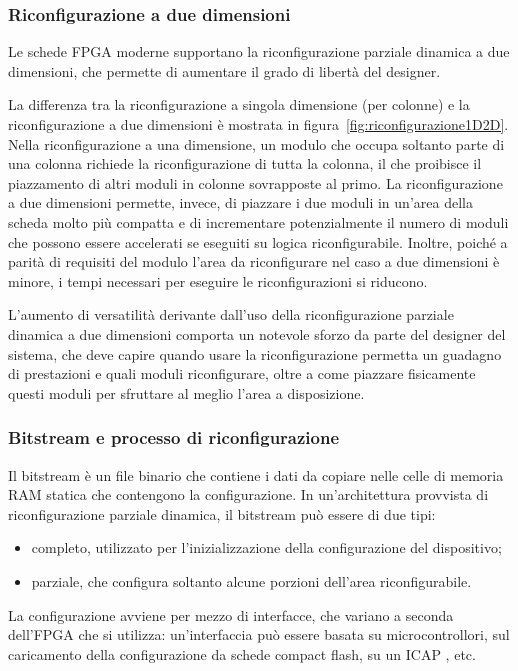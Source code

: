 \subsubsection{Riconfigurazione a due dimensioni}
Le schede \ac{FPGA} moderne supportano la riconfigurazione parziale dinamica a due dimensioni,
che permette di aumentare il grado di libertà del designer.

La differenza tra la riconfigurazione a singola dimensione (per colonne) e la
riconfigurazione a due dimensioni è mostrata in figura~\ref{fig:riconfigurazione1D2D}.
Nella riconfigurazione a una dimensione, un modulo che occupa soltanto parte di una
colonna richiede la riconfigurazione di tutta la colonna, il che proibisce il piazzamento
di altri moduli in colonne sovrapposte al primo. La riconfigurazione a due dimensioni
permette, invece, di piazzare i due moduli in un'area della scheda molto più compatta e di
incrementare potenzialmente il numero di moduli che possono essere accelerati se eseguiti
su logica riconfigurabile. Inoltre, poich\'e a parit\`a di requisiti del modulo l'area da
riconfigurare nel caso a due dimensioni \`e minore, i tempi necessari per eseguire
le riconfigurazioni si riducono.

L'aumento di versatilità derivante dall'uso della riconfigurazione parziale dinamica
a due dimensioni comporta un notevole sforzo da parte del designer del sistema,
che deve capire quando usare la riconfigurazione permetta un guadagno di prestazioni
e quali moduli riconfigurare, oltre a come piazzare fisicamente questi moduli per sfruttare al
meglio l'area a disposizione.

\subsubsection{Bitstream e processo di riconfigurazione}
Il bitstream è un file binario che contiene i dati da copiare nelle celle di memoria RAM
statica che contengono la configurazione. In un'architettura provvista di
riconfigurazione parziale dinamica, il bitstream può essere di due tipi:
\begin{itemize}
 \item completo, utilizzato per l'inizializzazione della configurazione del dispositivo;
 \item parziale, che configura soltanto alcune porzioni dell'area riconfigurabile.
\end{itemize}

La configurazione avviene per mezzo di interfacce, che variano a seconda dell'\ac{FPGA}
che si utilizza: un'interfaccia può essere basata su microcontrollori, sul caricamento
della configurazione da schede compact flash, su un \ac{ICAP}
\cite{ReconfigurableSystemDesignVerification}, etc.


